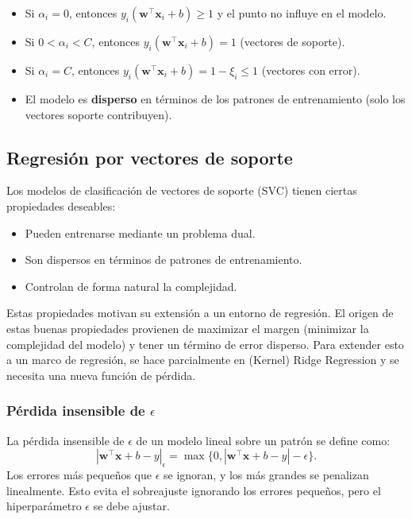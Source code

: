 \begin{itemize}
    \item Si $\alpha_i = 0$, entonces $y_i (\mathbf{w}^\top \mathbf{x}_i + b) \geq 1$ y el punto no influye en el modelo.
    
    \item Si $0 < \alpha_i < C$, entonces $y_i (\mathbf{w}^\top \mathbf{x}_i + b) = 1$ (vectores de soporte).
    
    \item Si $\alpha_i = C$, entonces $y_i (\mathbf{w}^\top \mathbf{x}_i + b) = 1 - \xi_i \leq 1$ (vectores con error).
    
    \item El modelo es \textbf{disperso} en términos de los patrones de entrenamiento (solo los vectores soporte contribuyen).
\end{itemize}

\subsection{Regresión por vectores de soporte}
Los modelos de clasificación de vectores de soporte (SVC) tienen ciertas propiedades deseables:
\begin{itemize}
\item Pueden entrenarse mediante un problema dual.
\item Son dispersos en términos de patrones de entrenamiento.
\item Controlan de forma natural la complejidad.
\end{itemize}

Estas propiedades motivan su extensión a un entorno de regresión. El origen de estas buenas propiedades provienen de maximizar el margen (minimizar la complejidad del modelo) y tener un término de error disperso. Para extender esto a un marco de regresión, se hace parcialmente en (Kernel) Ridge Regression y se necesita una nueva función de pérdida.

\subsubsection{Pérdida insensible de $\epsilon$}
La pérdida insensible de $\epsilon$ de un modelo lineal sobre un patrón se define como:
$$|\mathbf{w}^\intercal \mathbf{x} + b - y|_\epsilon = \max\bigl\{0, |\mathbf{w}^\intercal \mathbf{x} + b - y| - \epsilon\bigr\}.
$$
Los errores más pequeños que $\epsilon$ se ignoran, y los más grandes se penalizan linealmente. Esto evita el sobreajuste ignorando los errores pequeños, pero el hiperparámetro $\epsilon$ se debe ajustar.

